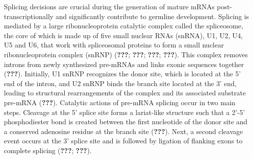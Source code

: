 \documentclass[12pt,oneside]{reedthesis}
\begin{document}
Splicing decisions are crucial during the generation of mature mRNAs
post-transcriptionally and significantly contribute to germline
development. Splicing is mediated by a large ribonucleoprotein catalytic
complex called the spliceosome, the core of which is made up of five
small nuclear RNAs (snRNA), U1, U2, U4, U5 and U6, that work with
spliceosomal proteins to form a small nuclear ribonucleoprotein complex
(snRNP) ({\textbf{???}}; {\textbf{???}}; {\textbf{???}}; {\textbf{???}}). This
complex removes introns from newly synthesized pre-mRNAs and links
exonic sequences together ({\textbf{???}}). Initially, U1 snRNP recognizes
the donor site, which is located at the 5' end of the intron, and U2
snRNP binds the branch site located at the 3' end, leading to structural
rearrangements of the complex and its associated substrate pre-mRNA
({\textbf{???}}). Catalytic actions of pre-mRNA splicing occur in two
main steps. Cleavage at the 5' splice site forms a lariat-like structure
such that a 2'-5' phosphodiester bond is created between the first
nucleotide of the donor site and a conserved adenosine residue at the
branch site ({\textbf{???}}). Next, a second cleavage event occurs at
the 3' splice site and is followed by ligation of flanking exons to
complete splicing ({\textbf{???}}; {\textbf{???}}).
\end{document}
